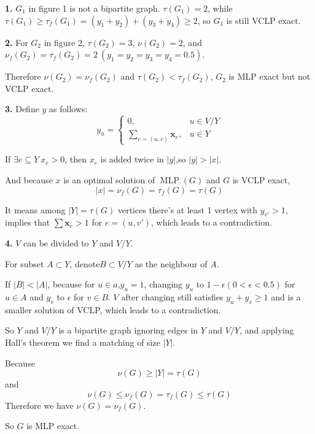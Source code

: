 \documentclass[11pt,a4paper,oneside]{article}
\newcommand{\x}{\mathbf{x}}
\begin{document}
\begin{problem}{4}
		\textbf{1. }$G_1$ in figure 1 is not a bipartite graph. $\tau(G_1)=2$, while $\tau(G_1)\geq \tau_{f}(G_1)=(y_1+y_2)+(y_3+y_4)\geq 2$, so $G_1$ is still VCLP exact.
		
    \textbf{2. }For $G_2$ in figure 2, $\tau(G_2)=3$,  $\nu(G_2)=2$, and $\nu_{f}(G_2)=\tau_{f}(G_2)=2\ (y_1=y_2=y_3=y_4=0.5)$. 
    
		Therefore $\nu(G_2)=\nu_f(G_2)$ and $\tau(G_2)<\tau_f(G_2)$, $G_2$ is MLP exact but not VCLP exact.
		
    \textbf{3. }Define $y$ as follows:
    $$
      y_u=
      \begin{cases}
      0, &u \in V/Y \\
      \sum_{e = (u, v)} \x_e, & u\in Y
      \end{cases}
    $$
    
    If $\exists e\subseteq Y\ x_e>0$, then $x_e$ is added twice in $|y|$,so $|y|>|x|$.
    
    And because $x$ is an optimal solution of $\operatorname{MLP}(G)$ and $G$ is VCLP exact, $$|x|=\nu_{f}(G)=\tau_{f}(G)=\tau(G)$$
    
		It means among $|Y|=\tau(G)$ vertices there's at least 1 vertex with $y_{v'}>1$, implies that $\sum\x_e>1$ for $e=(u,v')$, which leads to a contradiction.
		
    \textbf{4. }$V$ can be divided to $Y$ and $V/Y$. 

    For subset $A\subset Y$, denote$B\subset V/Y$ as the neighbour of $A$.
    
		If $|B|<|A|$, because for $u\in a$,$y_u=1$, changing $y_u$ to $1-\epsilon(0<\epsilon<0.5)$ for $u\in A$ and $y_v$ to $\epsilon$ for $v\in B$. $V$ after changing still satisfies $y_u+y_v\geq 1$ and is a smaller solution of VCLP, which leads to a contradiction.
		 
    So $Y$ and $V/Y$ is a bipartite graph ignoring edges in $Y$ and $V/Y$, and applying Hall's theorem we find a matching of size $|Y|$. 
    
    Because $$\nu(G)\geq|Y|=\tau(G)$$ and $$\nu(G) \leq \nu_{f}(G)=\tau_{f}(G) \leq \tau(G)$$ Therefore we have $\nu(G)=\nu_f(G)$. 
    
		So $G$ is MLP exact.
		 
	
\end{problem}
\end{document}
